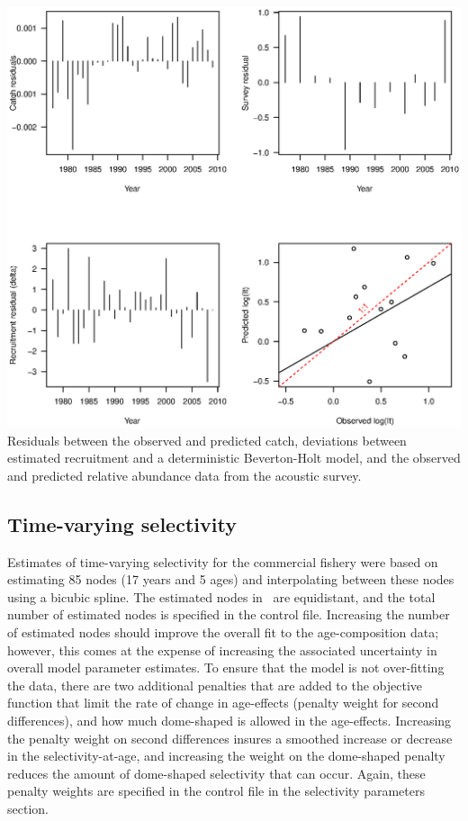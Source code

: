 \begin{multicols}{2}
\begin{figurehere}
	\centering
	\includegraphics[width=0.9\columnwidth]{iscamFigs/phakefig11.eps}\\
	\caption{Residuals between the observed and predicted catch, deviations between estimated recruitment and a deterministic Beverton-Holt model, and the observed and predicted relative abundance data from the acoustic survey.}\label{fig12}
\end{figurehere}


\subsection{Time-varying selectivity}
Estimates of time-varying selectivity for the commercial fishery were based on estimating 85 nodes (17 years and 5 ages) and interpolating between these nodes using a bicubic spline.  The estimated nodes in \iscam\ are equidistant, and the total number of estimated nodes is specified in the control file.  Increasing the number of estimated nodes should improve the overall fit to the age-composition data; however, this comes at the expense of increasing the associated uncertainty in overall model parameter estimates.  To ensure that the model is not over-fitting the data, there are two additional penalties that are added to the objective function that limit the rate of change in age-effects (penalty weight for second differences), and how much dome-shaped is allowed in the age-effects.  Increasing the penalty weight on second differences insures a smoothed increase or decrease in the selectivity-at-age, and increasing the weight on the dome-shaped penalty reduces the amount of dome-shaped selectivity that can occur.  Again, these penalty weights are specified in the control file  in the selectivity parameters section.


\end{multicols}
